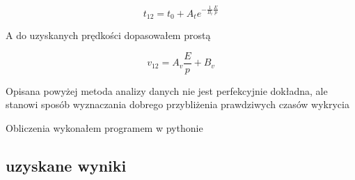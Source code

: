 \documentclass[10pt,a4paper]{article}
\begin{document}
\begin{equation*}
    t_{12} = t_0 + A_te^{-\frac{1}{B_t}\frac{E}{p}}
\end{equation*}

A do uzyskanych prędkości dopasowałem prostą

\begin{equation*}
    v_{12} = A_v \frac{E}{p} + B_v
\end{equation*}

Opisana powyżej metoda analizy danych nie jest perfekcyjnie dokładna, ale stanowi sposób wyznaczania dobrego przybliżenia prawdziwych czasów wykrycia

Obliczenia wykonałem programem w pythonie

\newpage

\subsection{uzyskane wyniki}
\end{document}
